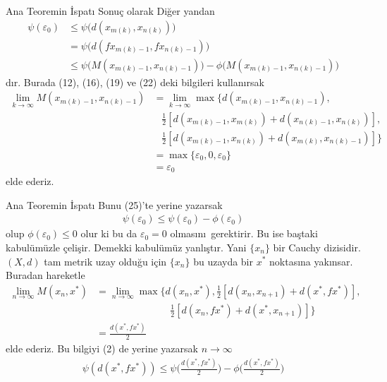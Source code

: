 \documentclass[8pt]{beamer}
\begin{document}
\begin{frame}
 \begin{block}{Ana Teoremin \.{I}spat\i }
Sonu\c{c} olarak 
Di\u{g}er yandan
    \begin{align}
      \psi(\varepsilon_0)&\leq \psi\big(d(x_{m(k)},x_{n(k)})\big)\\ 
      &= \psi\big(d(fx_{m(k)-1},fx_{n(k)-1})\big)\\
      &\leq \psi\big(M(x_{m(k)-1},x_{n(k)-1})\big)-\phi\big(M(x_{m(k)-1},x_{n(k)-1})\big)    \end{align}
d\i r. Burada (12), (16), (19) ve (22) deki bilgileri kullan\i rsak
     \begin{align}
        \lim_{k\to \infty}M(x_{m(k)-1},x_{n(k)-1})&=\lim_{k\to \infty}\max\bigg\{ d(x_{m(k)-1},x_{n(k)-1}),\\
       &\hspace{10pt}\frac{1}{2}[d(x_{m(k)-1},x_{m(k)})+d(x_{n(k)-1},x_{n(k)})],\\
       &\hspace{10pt}\frac{1}{2}[d(x_{m(k)-1},x_{n(k)})+d(x_{m(k)},x_{n(k)-1})] \bigg\}\\
       &=\max\{\varepsilon_0, 0, \varepsilon_0\}\\
       &=\varepsilon_0
     \end{align}
elde ederiz. 
\end{block}
\end{frame}%


\begin{frame}
 \begin{block}{Ana Teoremin \.{I}spat\i }
Bunu (25)'te yerine yazarsak
    \begin{align}
      \psi(\varepsilon_0)\leq\psi(\varepsilon_0)-\phi(\varepsilon_0)
    \end{align}
olup  $\phi(\varepsilon_0)\leq 0$ olur ki bu da $\varepsilon_0=0$ olmas\i n\i\ gerektirir. Bu ise ba\c{s}taki kabul\"um\"uzle \c{c}eli\c{s}ir. Demekki kabul\"um\"uz yanl\i \c{s}t\i r. Yani $\{x_n\}$ bir Cauchy dizisidir. $(X,d)$ tam metrik uzay oldu\u{g}u i\c{c}in $\{x_n\}$ bu uzayda bir $x^*$ noktas\i na yak\i nsar. 
Buradan hareketle
    \begin{align}
      \lim_{n\to \infty}M(x_n, x^*)&=\lim_{n\to \infty}\max\bigg\{ d(x_n,x^*),\frac{1}{2}[ d(x_n,x_{n+1})+ d(x^*,fx^*)],\\
      &\hspace{90pt}\frac{1}{2}[ d(x_n,fx^*)+ d(x^*,x_{n+1})]\bigg\}\\
      & =\frac{d(x^*,fx^*)}{2}
    \end{align}
elde ederiz. Bu bilgiyi (2) de yerine yazarsak $n\to \infty$
\begin{align}
  \psi(d(x^*,fx^*))\leq \psi\big(\frac{d(x^*,fx^*)}{2}\big)-\phi\big(\frac{d(x^*,fx^*)}{2}\big) 
\end{align}
\end{block}
\end{frame}%
\end{document}
